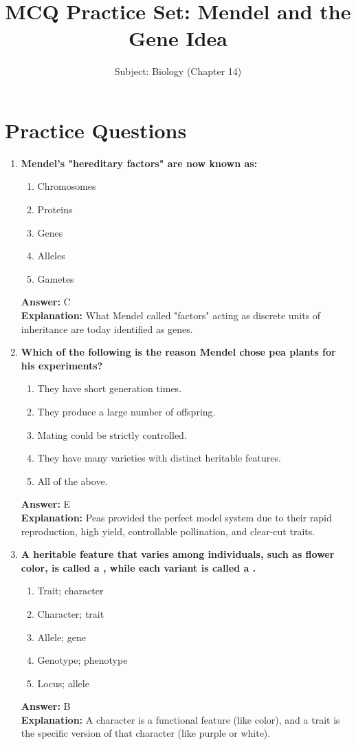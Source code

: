 \documentclass[11pt, a4paper]{article}
\title{MCQ Practice Set: Mendel and the Gene Idea}
\author{Subject: Biology (Chapter 14)}
\date{}
\begin{document}
\maketitle

\section*{Practice Questions}

\begin{enumerate}[leftmargin=*, label=\arabic*.]

\item \textbf{Mendel's "hereditary factors" are now known as:}
\begin{enumerate}[label=\Alph*.]
\item Chromosomes
\item Proteins
\item Genes
\item Alleles
\item Gametes
\end{enumerate}
\textbf{Answer:} C \\
\textbf{Explanation:} What Mendel called "factors" acting as discrete units of inheritance are today identified as genes.

\item \textbf{Which of the following is the reason Mendel chose pea plants for his experiments?}
\begin{enumerate}[label=\Alph*.]
\item They have short generation times.
\item They produce a large number of offspring.
\item Mating could be strictly controlled.
\item They have many varieties with distinct heritable features.
\item All of the above.
\end{enumerate}
\textbf{Answer:} E \\
\textbf{Explanation:} Peas provided the perfect model system due to their rapid reproduction, high yield, controllable pollination, and clear-cut traits.

\item \textbf{A heritable feature that varies among individuals, such as flower color, is called a \underline{\hspace{1cm}}, while each variant is called a \underline{\hspace{1cm}}.}
\begin{enumerate}[label=\Alph*.]
\item Trait; character
\item Character; trait
\item Allele; gene
\item Genotype; phenotype
\item Locus; allele
\end{enumerate}
\textbf{Answer:} B \\
\textbf{Explanation:} A character is a functional feature (like color), and a trait is the specific version of that character (like purple or white).


\end{enumerate}
\end{document}
